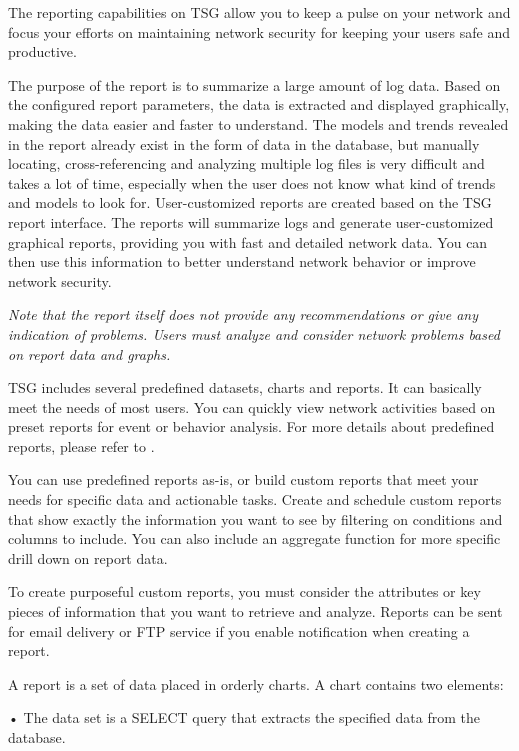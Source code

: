 The reporting capabilities on TSG allow you to keep a pulse on your network and focus your efforts on maintaining network security for keeping your users safe and productive.


The purpose of the report is to summarize a large amount of log data. Based on the configured report parameters, the data is extracted and displayed graphically, making the data easier and faster to understand. The models and trends revealed in the report already exist in the form of data in the database, but manually locating, cross-referencing and analyzing multiple log files is very difficult and takes a lot of time, especially when the user does not know what kind of trends and models to look for. User-customized reports are created based on the TSG report interface. The reports will summarize logs and generate user-customized graphical reports, providing you with fast and detailed network data. You can then use this information to better understand network behavior or improve network security. 


\notemark\textit{Note that the report itself does not provide any recommendations or give any indication of problems. Users must analyze and consider network problems based on report data and graphs.}


TSG includes several predefined datasets, charts and reports. It can basically meet the needs of most users. 
You can quickly view network activities based on preset reports for event or behavior analysis. 
For more details about predefined reports, please refer to \hyperlink{link:Appendix C Predefined Reports}{\color{linkblue}{Appendix C Predefined Reports}}.


You can use predefined reports as-is, or build custom reports that meet your needs for specific data and actionable tasks. 
Create and schedule custom reports that show exactly the information you want to see by filtering on conditions and columns to include. 
You can also include an aggregate function for more specific drill down on report data.


To create purposeful custom reports, you must consider the attributes or key pieces of information that you want to retrieve and analyze. 
Reports can be sent for email delivery or FTP service if you enable notification when creating a report. 


A report is a set of data placed in orderly charts. A chart contains two elements: 


• The data set is a SELECT query that extracts the specified data from the database. 


